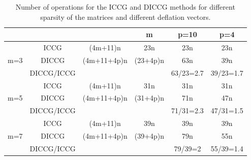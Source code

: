 \documentclass[12pt]{article}
\begin{document}
 \begin{table}[!h]
 \centering
\begin{tabular}{ |c|c|c|c|c|c| } 

  \hline
&&&m&p=10&p=4\\
\hline
&ICCG&(4m+11)n&23n&23n&23n\\
m=3&DICCG&(4m+11+4p)n&(23+4p)n&63n&39n\\
&DICCG/ICCG&&&63/23=2.7&39/23=1.7\\

\hline
&ICCG&(4m+11)n&31n&31n&31n\\
m=5&DICCG&(4m+11+4p)n&(31+4p)n&71n&47n\\
&DICCG/ICCG&&&71/31=2.3&47/31=1.5\\
\hline

&ICCG&(4m+11)n&39n&39n&39n\\
m=7&DICCG&(4m+11+4p)n&(39+4p)n&79n&55n\\
&DICCG/ICCG&&&79/39=2&55/39=1.4\\
\hline
\end{tabular}\caption{Number of operations for the ICCG and DICCG methods for different sparsity of the matrices and different deflation vectors.}\label{table:oper}
\end{table}
\end{document}
